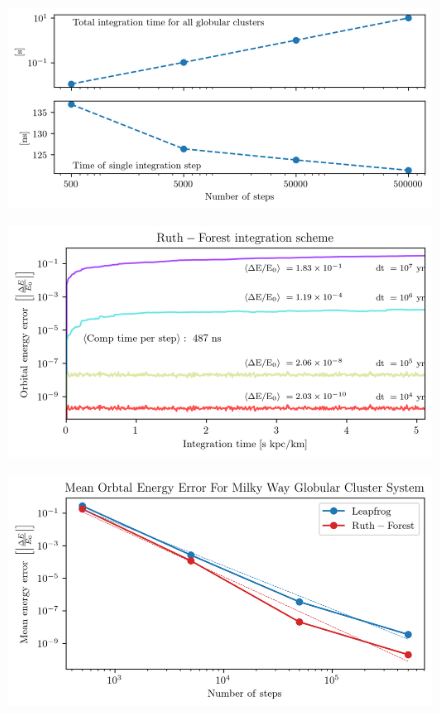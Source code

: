         \begin{figure}
            \centering
            \includegraphics[width=\linewidth]{images/numericalErrorGlobularClustersComputationTime.png}
            \caption{}
            \label{fig:numericalErrorGlobularClustersComputationTime.png}
        \end{figure}

        \begin{figure}
            \centering
            \includegraphics[width=\linewidth]{images/numericalErrorRuthForest.png}
            \caption{}
            \label{fig:numericalErrorRuthForest.png}
        \end{figure}

    

        \begin{figure}
            \centering
            \includegraphics[width=\linewidth]{images/numericalErrorMeanEnergyErrorRuthForestLeapFrog.png}
            \caption{}
            \label{fig:numericalErrorMeanEnergyErrorRuthForestLeapFrog.png}
        \end{figure}    



